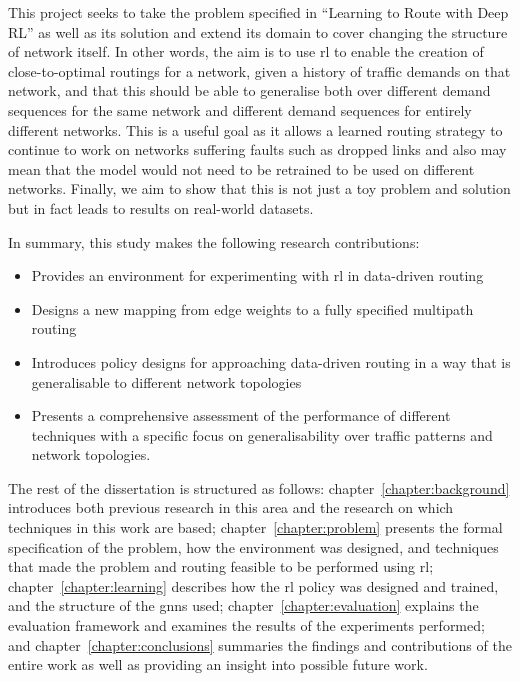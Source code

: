 This project seeks to take the problem specified in ``Learning to Route with Deep RL'' as well as its solution and extend its domain to cover changing the structure of network itself. In other words, the aim is to use \ac{rl} to enable the creation of close-to-optimal routings for a network, given a history of traffic demands on that network, and that this should be able to generalise both over different demand sequences for the same network and different demand sequences for entirely different networks. This is a useful goal as it allows a learned routing strategy to continue to work on networks suffering faults such as dropped links and also may mean that the model would not need to be retrained to be used on different networks. Finally, we aim to show that this is not just a toy problem and solution but in fact leads to results on real-world datasets.

In summary, this study makes the following research contributions:
\begin{itemize}
  \item Provides an environment for experimenting with \ac{rl} in data-driven routing
  \item Designs a new mapping from edge weights to a fully specified multipath routing
  \item Introduces policy designs for approaching data-driven routing in a way that is generalisable to different network topologies
  \item Presents a comprehensive assessment of the performance of different techniques with a specific focus on generalisability over traffic patterns and network topologies.
\end{itemize}

The rest of the dissertation is structured as follows: chapter~\ref{chapter:background} introduces both previous research in this area and the research on which techniques in this work are based; chapter~\ref{chapter:problem} presents the formal specification of the problem, how the environment was designed, and techniques that made the problem and routing feasible to be performed using \ac{rl}; chapter~\ref{chapter:learning} describes how the \ac{rl} policy was designed and trained, and the structure of the \acp{gnn} used; chapter~\ref{chapter:evaluation} explains the evaluation framework and examines the results of the experiments performed; and chapter~\ref{chapter:conclusions} summaries the findings and contributions of the entire work as well as providing an insight into possible future work.
